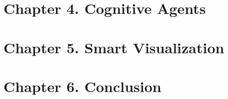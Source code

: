 \chapter{Chapter 4. Cognitive Agents}
\chapter{Chapter 5. Smart Visualization}
\chapter{Chapter 6. Conclusion}
    